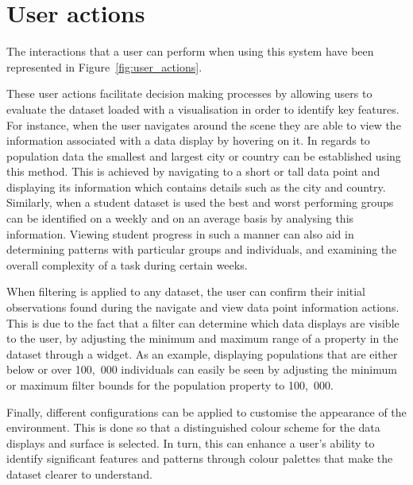 \section{User actions} {
\label{sec:user_actions}

	The interactions that a user can perform when using this system have been represented in Figure~\ref{fig:user_actions}.

	

	These user actions facilitate decision making processes by allowing users to evaluate the dataset loaded with a visualisation in order to identify key features. For instance, when the user navigates around the scene they are able to view the information associated with a data display by hovering on it. In regards to population data the smallest and largest city or country can be established using this method. This is achieved by navigating to a short or tall data point and displaying its information which contains details such as the city and country. Similarly, when a student dataset is used the best and worst performing groups can be identified on a weekly and on an average basis by analysing this information. Viewing student progress in such a manner can also aid in determining patterns with particular groups and individuals, and examining the overall complexity of a task during certain weeks. 

	When filtering is applied to any dataset, the user can confirm their initial observations found during the navigate and view data point information actions. This is due to the fact that a filter can determine which data displays are visible to the user, by adjusting the minimum and maximum range of a property in the dataset through a widget. As an example, displaying populations that are either below or over 100,~000 individuals can easily be seen by adjusting the minimum or maximum filter bounds for the population property to 100,~000.

	Finally, different configurations can be applied to customise the appearance of the environment. This is done so that a distinguished colour scheme for the data displays and surface is selected. In turn, this can enhance a user's ability to identify significant features and patterns through colour palettes that make the dataset clearer to understand.

}

